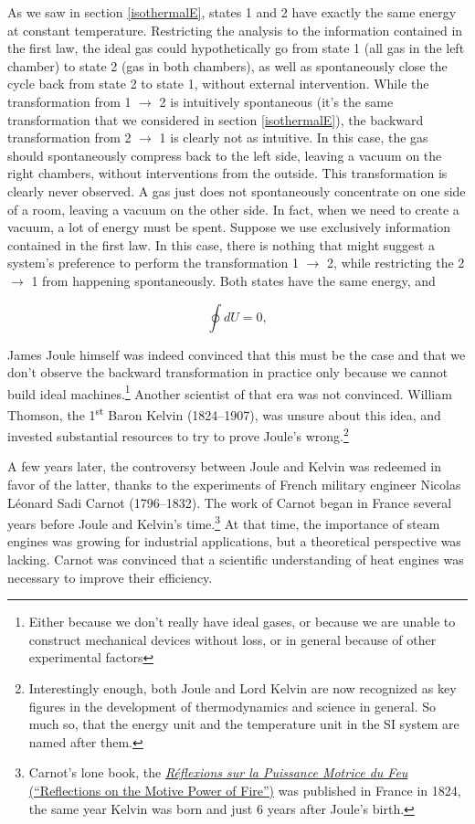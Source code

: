 \documentclass[
  9pt,
]{extbook}
\theoremstyle{definition}
\theoremstyle{definition}
\theoremstyle{definition}
\theoremstyle{remark}
\begin{document}
As we saw in section \ref{isothermalE}, states 1 and 2 have exactly the same energy at constant temperature. Restricting the analysis to the information contained in the first law, the ideal gas could hypothetically go from state 1 (all gas in the left chamber) to state 2 (gas in both chambers), as well as spontaneously close the cycle back from state 2 to state 1, without external intervention. While the transformation from 1 \(\rightarrow\) 2 is intuitively spontaneous (it's the same transformation that we considered in section \ref{isothermalE}), the backward transformation from 2 \(\rightarrow\) 1 is clearly not as intuitive. In this case, the gas should spontaneously compress back to the left side, leaving a vacuum on the right chambers, without interventions from the outside. This transformation is clearly never observed. A gas just does not spontaneously concentrate on one side of a room, leaving a vacuum on the other side. In fact, when we need to create a vacuum, a lot of energy must be spent. Suppose we use exclusively information contained in the first law. In this case, there is nothing that might suggest a system's preference to perform the transformation 1 \(\rightarrow\) 2, while restricting the 2 \(\rightarrow\) 1 from happening spontaneously. Both states have the same energy, and

\begin{equation}
  \oint dU=0,
  \label{eq:de0c}
\end{equation}

James Joule himself was indeed convinced that this must be the case and that we don't observe the backward transformation in practice only because we cannot build ideal machines.\footnote{Either because we don't really have ideal gases, or because we are unable to construct mechanical devices without loss, or in general because of other experimental factors} Another scientist of that era was not convinced. William Thomson, the 1\textsuperscript{st} Baron Kelvin (1824--1907), was unsure about this idea, and invested substantial resources to try to prove Joule's wrong.\footnote{Interestingly enough, both Joule and Lord Kelvin are now recognized as key figures in the development of thermodynamics and science in general. So much so, that the energy unit and the temperature unit in the SI system are named after them.}

A few years later, the controversy between Joule and Kelvin was redeemed in favor of the latter, thanks to the experiments of French military engineer Nicolas Léonard Sadi Carnot (1796--1832). The work of Carnot began in France several years before Joule and Kelvin's time.\footnote{Carnot's lone book, the \href{https://en.wikipedia.org/wiki/Reflections_on_the_Motive_Power_of_Fire}{\emph{Réflexions sur la Puissance Motrice du Feu} (``Reflections on the Motive Power of Fire'')} was published in France in 1824, the same year Kelvin was born and just 6 years after Joule's birth.} At that time, the importance of steam engines was growing for industrial applications, but a theoretical perspective was lacking. Carnot was convinced that a scientific understanding of heat engines was necessary to improve their efficiency.
\end{document}
